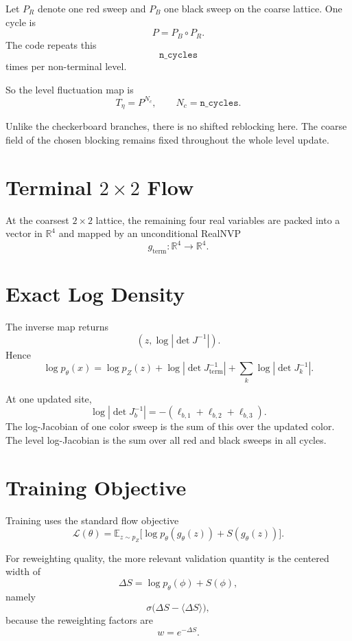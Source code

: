 \documentclass[11pt]{article}
\begin{document}
Let $P_R$ denote one red sweep and $P_B$ one black sweep on the coarse lattice.
One cycle is
\[
P = P_B \circ P_R.
\]
The code repeats this
\[
\texttt{n\_cycles}
\]
times per non-terminal level.

So the level fluctuation map is
\[
T_\eta = P^{N_c},
\qquad
N_c=\texttt{n\_cycles}.
\]

Unlike the checkerboard branches, there is no shifted reblocking here. The
coarse field of the chosen blocking remains fixed throughout the whole level
update.

\section{Terminal $2\times 2$ Flow}

At the coarsest $2\times 2$ lattice, the remaining four real variables are
packed into a vector in $\mathbb{R}^4$ and mapped by an unconditional RealNVP
\[
g_{\mathrm{term}}:\mathbb{R}^4\to\mathbb{R}^4.
\]

\section{Exact Log Density}

The inverse map returns
\[
(z,\log|\det J^{-1}|).
\]
Hence
\begin{equation}
\log p_\theta(x)
= \log p_Z(z)
+ \log|\det J_{\mathrm{term}}^{-1}|
+ \sum_k \log|\det J_k^{-1}|.
\end{equation}

At one updated site,
\[
\log|\det J_b^{-1}| = -(\ell_{b,1}+\ell_{b,2}+\ell_{b,3}).
\]
The log-Jacobian of one color sweep is the sum of this over the updated color.
The level log-Jacobian is the sum over all red and black sweeps in all cycles.

\section{Training Objective}

Training uses the standard flow objective
\begin{equation}
\mathcal L(\theta)=
\mathbb E_{z\sim p_Z}
\bigl[
\log p_\theta(g_\theta(z)) + S(g_\theta(z))
\bigr].
\end{equation}

For reweighting quality, the more relevant validation quantity is the centered
width of
\[
\Delta S = \log p_\theta(\phi) + S(\phi),
\]
namely
\[
\sigma\bigl(\Delta S-\langle\Delta S\rangle\bigr),
\]
because the reweighting factors are
\[
w=e^{-\Delta S}.
\]
\end{document}
